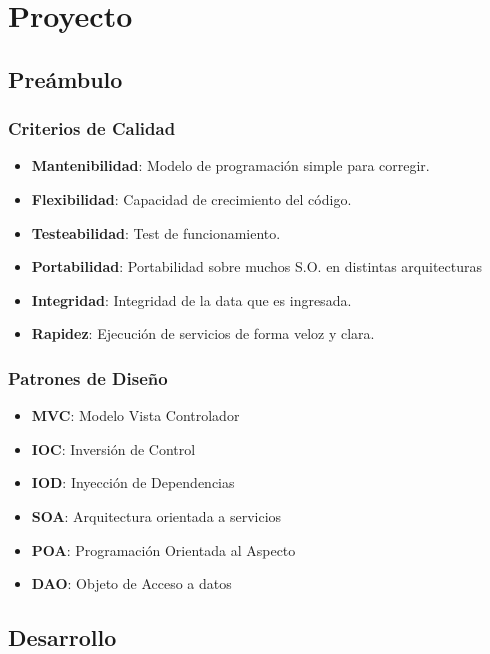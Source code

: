 \documentclass{beamer}
\begin{document}
\section{Proyecto}

\subsection{Preámbulo}


\begin{frame}
\frametitle{Criterios de Calidad}
\begin{itemize}
\item \textbf{Mantenibilidad}: Modelo de programación simple para corregir.
\item \textbf{Flexibilidad}: Capacidad de crecimiento del código.
\item \textbf{Testeabilidad}: Test de funcionamiento.
\item \textbf{Portabilidad}: Portabilidad sobre muchos S.O. en distintas arquitecturas
\item \textbf{Integridad}: Integridad de la data que es ingresada.
\item \textbf{Rapidez}: Ejecución de servicios de forma veloz y clara.
\end{itemize}
\end{frame}


\begin{frame}
\frametitle{Patrones de Diseño}
\begin{itemize}
\item \textbf{MVC}: Modelo Vista Controlador
\item \textbf{IOC}: Inversión de Control
\item \textbf{IOD}: Inyección de Dependencias
\item \textbf{SOA}: Arquitectura orientada a servicios
\item \textbf{POA}: Programación Orientada al Aspecto
\item \textbf{DAO}: Objeto de Acceso a datos
\end{itemize}
\end{frame}

\subsection{Desarrollo}
\end{document}
